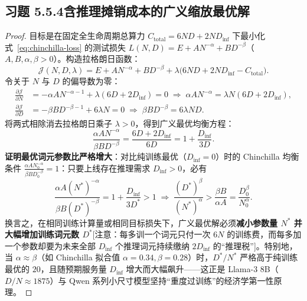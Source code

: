 \subsection*{习题 5.5.4\quad 含推理摊销成本的广义缩放最优解}
\begin{proof}
目标是在固定全生命周期总算力 $C_{\text{total}} = 6 N D + 2 N D_{\text{inf}}$ 下最小化式~\eqref{eq:chinchilla-loss} 的测试损失 $L(N, D) = E + A N^{-\alpha} + B D^{-\beta}$（$A, B, \alpha, \beta > 0$）。构造拉格朗日函数：
\[
  \mathcal{J}(N, D, \lambda) = E + A N^{-\alpha} + B D^{-\beta} + \lambda\big(6 N D + 2 N D_{\text{inf}} - C_{\text{total}}\big).
\]
令关于 $N$ 与 $D$ 的偏导数为零：
\begin{align*}
  \frac{\partial \mathcal{J}}{\partial N} &= -\alpha A N^{-\alpha - 1} + \lambda(6 D + 2 D_{\text{inf}}) = 0
  \;\Longrightarrow\; \alpha A N^{-\alpha} = \lambda N (6 D + 2 D_{\text{inf}}), \\
  \frac{\partial \mathcal{J}}{\partial D} &= -\beta B D^{-\beta - 1} + 6 \lambda N = 0
  \;\Longrightarrow\; \beta B D^{-\beta} = 6 \lambda N D.
\end{align*}
将两式相除消去拉格朗日乘子 $\lambda > 0$，得到广义最优均衡方程：
\[
  \frac{\alpha A N^{-\alpha}}{\beta B D^{-\beta}}
  = \frac{6 D + 2 D_{\text{inf}}}{6 D}
  = 1 + \frac{D_{\text{inf}}}{3 D}.
\]
\textbf{证明最优词元参数比严格增大}：对比纯训练最优（$D_{\text{inf}} = 0$）时的 Chinchilla 均衡条件 $\frac{\alpha A N_0^{-\alpha}}{\beta B D_0^{-\beta}} = 1$：只要上线存在推理需求 $D_{\text{inf}} > 0$，必有
\[
  \frac{\alpha A (N^*)^{-\alpha}}{\beta B (D^*)^{-\beta}} = 1 + \frac{D_{\text{inf}}}{3 D^*} > 1
  \;\Longrightarrow\;
  \frac{(D^*)^\beta}{(N^*)^\alpha} > \frac{\beta B}{\alpha A} = \frac{D_0^\beta}{N_0^\alpha}.
\]
换言之，在相同训练计算量或相同目标损失下，广义最优解必须\textbf{减小参数量 $N^*$ 并大幅增加训练词元数 $D^*$}[注意：每多训一个词元只付一次 $6N$ 的训练费，而每多加一个参数却要为未来全部 $D_{\text{inf}}$ 个推理词元持续缴纳 $2 D_{\text{inf}}$ 的“推理税”]。特别地，当 $\alpha \approx \beta$（如 Chinchilla 拟合值 $\alpha=0.34, \beta=0.28$）时，$D^*/N^*$ 严格高于纯训练最优的 $20$，且随预期服务量 $D_{\text{inf}}$ 增大而大幅飙升——这正是 Llama-3 8B（$D/N \approx 1875$）与 Qwen 系列小尺寸模型坚持“重度过训练”的经济学第一性原理。
\end{proof}

